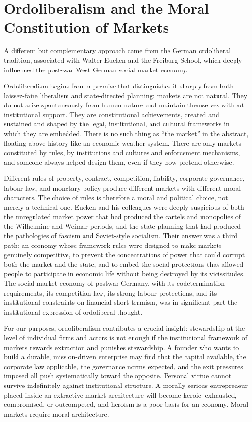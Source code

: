 \documentclass[11pt,a4paper,oneside]{book}
\begin{document}
\section*{Ordoliberalism and the Moral Constitution of Markets}

A different but complementary approach came from the German ordoliberal tradition, associated with Walter Eucken and the Freiburg School, which deeply influenced the post-war West German social market economy.

Ordoliberalism begins from a premise that distinguishes it sharply from both laissez-faire liberalism and state-directed planning: markets are not natural. They do not arise spontaneously from human nature and maintain themselves without institutional support. They are constitutional achievements, created and sustained and shaped by the legal, institutional, and cultural frameworks in which they are embedded. There is no such thing as ``the market'' in the abstract, floating above history like an economic weather system. There are only markets constituted by rules, by institutions and cultures and enforcement mechanisms, and someone always helped design them, even if they now pretend otherwise.

Different rules of property, contract, competition, liability, corporate governance, labour law, and monetary policy produce different markets with different moral characters. The choice of rules is therefore a moral and political choice, not merely a technical one. Eucken and his colleagues were deeply suspicious of both the unregulated market power that had produced the cartels and monopolies of the Wilhelmine and Weimar periods, and the state planning that had produced the pathologies of fascism and Soviet-style socialism. Their answer was a third path: an economy whose framework rules were designed to make markets genuinely competitive, to prevent the concentrations of power that could corrupt both the market and the state, and to embed the social protections that allowed people to participate in economic life without being destroyed by its vicissitudes. The social market economy of postwar Germany, with its codetermination requirements, its competition law, its strong labour protections, and its institutional constraints on financial short-termism, was in significant part the institutional expression of ordoliberal thought.

For our purposes, ordoliberalism contributes a crucial insight: stewardship at the level of individual firms and actors is not enough if the institutional framework of markets rewards extraction and punishes stewardship. A founder who wants to build a durable, mission-driven enterprise may find that the capital available, the corporate law applicable, the governance norms expected, and the exit pressures imposed all push systematically toward the opposite. Personal virtue cannot survive indefinitely against institutional structure. A morally serious entrepreneur placed inside an extractive market architecture will become heroic, exhausted, compromised, or outcompeted, and heroism is a poor basis for an economy. Moral markets require moral architecture.
\end{document}

